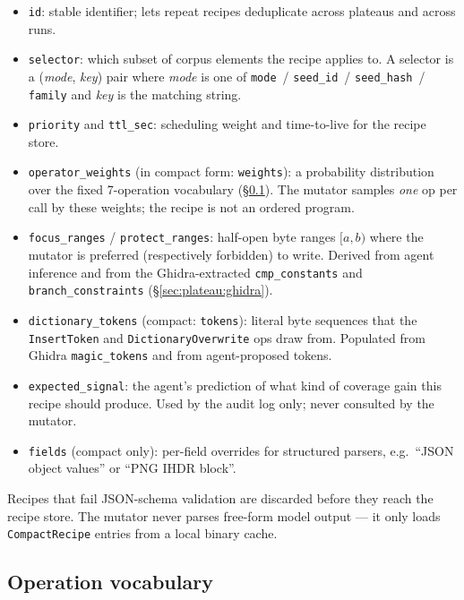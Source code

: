 \documentclass[11pt]{article}
\begin{document}
\begin{itemize}
  \item \texttt{id}: stable identifier; lets repeat recipes
  deduplicate across plateaus and across runs.
  \item \texttt{selector}: which subset of corpus elements the
  recipe applies to. A selector is a (\emph{mode}, \emph{key}) pair
  where \emph{mode} is one of \texttt{mode}~/ \texttt{seed\_id}~/
  \texttt{seed\_hash}~/ \texttt{family} and \emph{key} is the
  matching string.
  \item \texttt{priority} and \texttt{ttl\_sec}: scheduling weight
  and time-to-live for the recipe store.
  \item \texttt{operator\_weights} (in compact form:
  \texttt{weights}): a probability distribution over the fixed
  7-operation vocabulary (\S\ref{sec:recipe:ops}). The mutator
  samples \emph{one} op per call by these weights; the recipe is
  not an ordered program.
  \item \texttt{focus\_ranges} / \texttt{protect\_ranges}: half-open
  byte ranges $[a,b)$ where the mutator is preferred (respectively
  forbidden) to write. Derived from agent inference and from the
  Ghidra-extracted \texttt{cmp\_constants} and
  \texttt{branch\_constraints} (\S\ref{sec:plateau:ghidra}).
  \item \texttt{dictionary\_tokens} (compact: \texttt{tokens}):
  literal byte sequences that the \texttt{InsertToken} and
  \texttt{DictionaryOverwrite} ops draw from. Populated from
  Ghidra \texttt{magic\_tokens} and from agent-proposed tokens.
  \item \texttt{expected\_signal}: the agent's prediction of what
  kind of coverage gain this recipe should produce. Used by the
  audit log only; never consulted by the mutator.
  \item \texttt{fields} (compact only): per-field overrides for
  structured parsers, e.g.~``JSON object values'' or ``PNG IHDR
  block''.
\end{itemize}

Recipes that fail JSON-schema validation are discarded before they
reach the recipe store. The mutator never parses free-form model
output --- it only loads \texttt{CompactRecipe} entries from a
local binary cache.

\subsection{Operation vocabulary}
\label{sec:recipe:ops}
\end{document}

